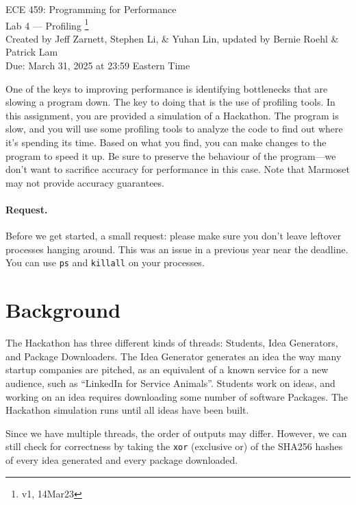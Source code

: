 



\begin{center}
{\Large ECE 459: Programming for Performance}\\
{\Large Lab 4 --- Profiling \footnote{v1, 14Mar23}}\\[1em]
{
Created by Jeff Zarnett, Stephen Li, \& Yuhan Lin, updated by Bernie Roehl \& Patrick Lam
}\\
Due: March 31, 2025 at 23:59 Eastern Time
\end{center}


One of the keys to improving performance is identifying bottlenecks that are slowing a program down. The key to doing that is the use of profiling tools. In this assignment, you are provided a simulation of a Hackathon. The program is slow,  and you will use some profiling tools to analyze the code to find out where it's spending its time. Based on what you find, you can make changes to the program to speed it up. Be sure to preserve the behaviour of the program---we don't want to sacrifice accuracy for performance in this case. Note that Marmoset may not provide accuracy guarantees.

\paragraph{Request.} Before we get started, a small request: please make sure you don't leave leftover processes hanging around. This was an issue in a previous year near the deadline. You can use \texttt{ps} and \texttt{killall} on your processes.

\section*{Background}


The Hackathon has three different kinds of threads: Students, Idea Generators, and Package Downloaders. The Idea Generator generates an idea the way many startup companies are pitched, as an equivalent of a known service for a new audience, such as ``LinkedIn for Service Animals''. Students work on ideas, and working on an idea requires downloading some number of software Packages. The Hackathon simulation runs until all ideas have been built. 


Since we have multiple threads, the order of outputs may differ. However, we can still check for correctness by taking the \texttt{xor} (exclusive or) of the SHA256 hashes of every idea generated and every package downloaded. 

